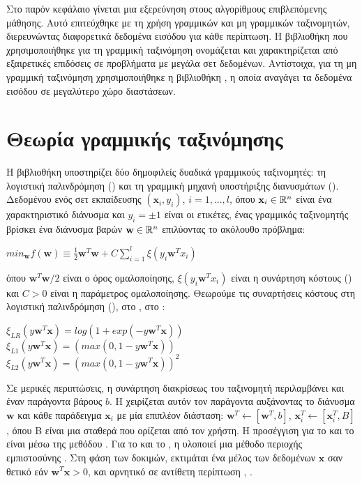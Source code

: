 Στο παρόν κεφάλαιο γίνεται μια εξερεύνηση στους αλγορίθμους επιβλεπόμενης μάθησης. Αυτό επιτεύχθηκε με τη χρήση γραμμικών και μη γραμμικών ταξινομητών, διερευνώντας διαφορετικά δεδομένα εισόδου για κάθε περίπτωση. Η βιβλιοθήκη που χρησιμοποιήθηκε για τη γραμμική ταξινόμηση ονομάζεται  και χαρακτηρίζεται από εξαιρετικές επιδόσεις σε προβλήματα με μεγάλα σετ δεδομένων. Αντίστοιχα, για τη μη γραμμική ταξινόμηση χρησιμοποιήθηκε η βιβλιοθήκη , η οποία αναγάγει τα δεδομένα εισόδου σε μεγαλύτερο χώρο διαστάσεων.
\section{Θεωρία γραμμικής ταξινόμησης}
Η βιβλιοθήκη  υποστηρίζει δύο δημοφιλείς δυαδικά γραμμικούς ταξινομητές: τη λογιστική παλινδρόμηση () και τη γραμμική μηχανή υποστήριξης διανυσμάτων (). Δεδομένου ενός σετ εκπαίδευσης $(\mathbf{x}_i, y_i)$, $i=1,...,l$, όπου $\mathbf{x}_i\in\mathbb{R}^n$ είναι ένα χαρακτηριστικό διάνυσμα και $y_i=\pm1$ είναι οι ετικέτες, ένας γραμμικός ταξινομητής βρίσκει ένα διάνυσμα βαρών $\mathbf{w}\in\mathbb{R}^n$ επιλύοντας το ακόλουθο πρόβλημα:
\begin{center}
$min_{\mathbf{w}}f(\mathbf{w})\equiv\frac{1}{2}\mathbf{w}^T\mathbf{w}+C\sum_{i=1}^{l}\xi(y_i\mathbf{w}^T x_i)$
\end{center}
όπου $\mathbf{w}^T\mathbf{w}/2$ είναι ο όρος ομαλοποίησης, $\xi(y_i\mathbf{w}^T x_i)$ είναι η συνάρτηση κόστους () και $C>0$ είναι η παράμετρος ομαλοποίησης. Θεωρούμε τις συναρτήσεις κόστους στη λογιστική παλινδρόμηση (), στο  , στο :
\begin{center}
$\xi_{LR}(y\mathbf{w}^T\mathbf{x})=log(1 + exp(-y\mathbf{w}^T\mathbf{x}))$\\
$\xi_{L1}(y\mathbf{w}^T\mathbf{x})=(max(0, 1 - y\mathbf{w}^T\mathbf{x}))$\\
$\xi_{L2}(y\mathbf{w}^T\mathbf{x})=(max(0, 1 - y\mathbf{w}^T\mathbf{x}))^2$
\end{center}
Σε μερικές περιπτώσεις, η συνάρτηση διακρίσεως του ταξινομητή περιλαμβάνει και έναν παράγοντα βάρους $b$. Η  χειρίζεται αυτόν τον παράγοντα αυξάνοντας το διάνυσμα $\mathbf{w}$ και κάθε παράδειγμα $\mathbf{x}_i$ με μία επιπλέον διάσταση: $\mathbf{w}^T \leftarrow [\mathbf{w}^T, b]$, $\mathbf{x}_i^T \leftarrow [\mathbf{x}_i^T, B]$, όπου B είναι μια σταθερά που ορίζεται από τον χρήστη. Η προσέγγιση για το  και το   είναι μέσω της μεθόδου . Για το  και το , η  υλοποιεί μια μέθοδο περιοχής εμπιστοσύνης . Στη φάση των δοκιμών, εκτιμάται ένα μέλος των δεδομένων $\mathbf{x}$ σαν θετικό εάν $\mathbf{w}^T\mathbf{x}>0$, και αρνητικό σε αντίθετη περίπτωση \cite{liblinearguide}, \cite{liblinearreport}.\par
